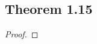 \documentclass[../../main.tex]{subfiles}
\begin{document}
\subsection{Theorem 1.15}
\begin{wts}

\end{wts}
\begin{proof}

\end{proof}
\end{document}
